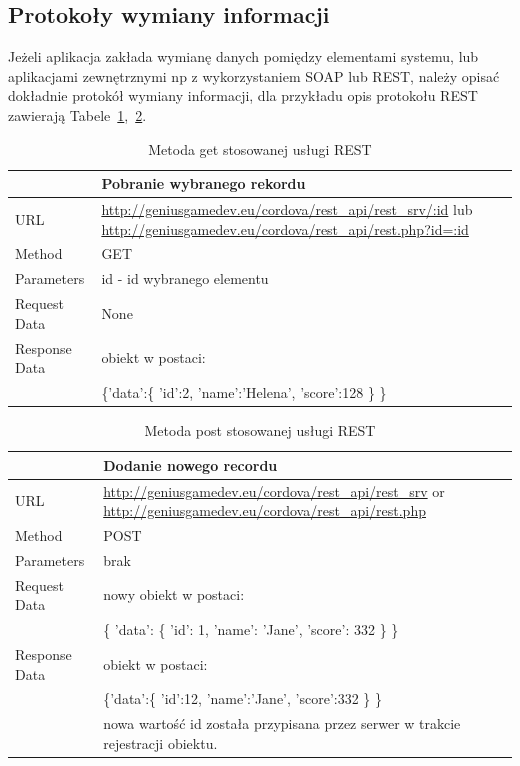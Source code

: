 \documentclass[12pt,a4paper]{article}
\begin{document}
\subsection{Protokoły wymiany informacji}
Jeżeli aplikacja zakłada wymianę danych pomiędzy elementami systemu, lub aplikacjami zewnętrznymi np z wykorzystaniem SOAP lub REST, należy opisać dokładnie protokół wymiany informacji, dla przykładu opis protokołu REST zawierają Tabele~\ref{rest1},~\ref{rest2}.

\begin{table}[th]
\begin{tabularx}{\textwidth}{|l|X|}
\hline
&\textbf{Pobranie wybranego rekordu}\\\hline
URL &   \url{http://geniusgamedev.eu/cordova/rest_api/rest_srv/:id} lub \url{http://geniusgamedev.eu/cordova/rest_api/rest.php?id=:id}\\\hline
Method  & GET\\\hline
Parameters  & id - id wybranego elementu \\\hline
Request Data & None\\\hline
Response Data & obiekt w postaci:\\
&

\{'data':\{
    'id':2,
    'name':'Helena',
    'score':128
    \}
\}

\\\hline
\end{tabularx}
\caption{Metoda get stosowanej usługi REST}\label{rest1}
\end{table}

\begin{table}
\begin{tabularx}{\textwidth}{|l|X|}
\hline
&\textbf{Dodanie nowego recordu}\\\hline
URL &   \url{http://geniusgamedev.eu/cordova/rest_api/rest_srv} or \url{http://geniusgamedev.eu/cordova/rest_api/rest.php}\\\hline
Method  & POST\\\hline
Parameters  & brak \\\hline
Request Data & nowy obiekt w postaci:\\
&\{
'data': \{
'id': 1,
'name': 'Jane',
'score': 332
\}
\}
\\\hline
Response Data & obiekt w postaci:\\
&
\{'data':\{
    'id':12,
    'name':'Jane',
    'score':332
    \}
\}
\\
&nowa wartość id została przypisana przez serwer w trakcie rejestracji obiektu.
\\\hline
\end{tabularx}
\caption{Metoda post stosowanej usługi REST}\label{rest2}
\end{table}
\end{document}
